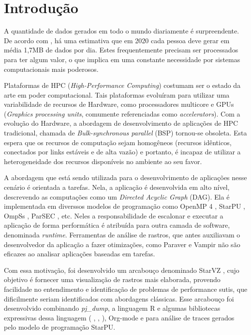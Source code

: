 \chapter{Introdução} \label{ch:intro}

A quantidade de dados gerados em todo o mundo diariamente é surpreendente. De 
acordo com \citet{ref:data_minute2}, há uma estimativa que em 2020 cada pessoa 
deve gerar em média 1,7MB de dados por dia. Estes frequentemente precisam ser 
processados para ter algum valor, o que implica em uma constante necessidade por 
sistemas computacionais mais poderosos.

Plataformas de HPC (\textit{High-Performance Computing}) costumam ser o estado 
da arte em poder computacional. Tais plataformas evoluíram para utilizar 
uma variabilidade de recursos de Hardware, como processadores multicore e GPUs 
(\textit{Graphics processing units}, comumente referenciadas como 
\textit{accelerators}). Com a evolução do Hardware, a abordagem de 
desenvolvimento de aplicações de HPC tradicional, chamada de 
\textit{Bulk-synchronous parallel} (BSP) tornou-se obsoleta. Esta espera que os 
recursos de computação sejam homogêneos (recursos idênticos, conectados por 
links estáveis e de alta vazão) e portanto, é incapaz de utilizar a 
heterogeneidade dos recursos disponíveis no ambiente ao seu favor. 

A abordagem que está sendo utilizada para o desenvolvimento de aplicações nesse 
cenário é orientada a tarefas. Nela, a aplicação é desenvolvida em alto nível, 
descrevendo as computações como um \textit{Directed Acyclic Graph} (DAG). Ela é 
implementada em diverssos modelos de programação como OpenMP 4 
\cite{ref:openmp4}, StarPU \cite{ref:starpu}, OmpSs \cite{ref:ompss}, 
ParSEC \cite{ref:parsec}, etc. Neles a responsabilidade de 
escalonar e executar a aplicação de forma performática é atribuída para outra 
camada de software, denominada \textit{runtime}. Ferramentas de análise de 
rastros, que antes auxiliavam o desenvolvedor da aplicação a fazer 
otimizações, como Paraver \cite{ref:paraver} e Vampir \cite{ref:vampir} não são 
eficazes ao analisar aplicações baseadas em tarefas.

Com essa motivação, foi desenvolvido um arcabouço denominado StarVZ 
\cite{ref:starvz}, cujo objetivo é fornecer uma visualização de rastros mais 
elaborada, provendo facilidade no entendimento e identificação de problemas de 
performance sutis, que dificilmente seriam identificados com abordagens 
clássicas. Esse arcabouço foi desenvolvido combinando \textit{pj\_dump},  
a linguagem R \cite{ref:rlanguage} e algumas bibliotecas expressivas dessa 
linguagem ( \cite{ref:ggplot2},  
\cite{ref:lpsolve},  \cite{ref:tidyverse}), Org-mode 
\cite{ref:org-mode} e  para análise de traces gerados pelo 
modelo de programação StarPU.


